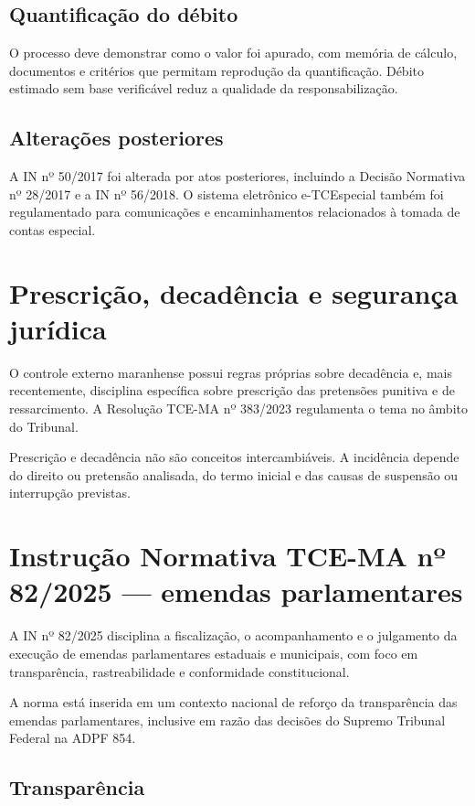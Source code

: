 \subsection{Quantificação do débito}

O processo deve demonstrar como o valor foi apurado, com memória de cálculo, documentos e critérios que permitam reprodução da quantificação. Débito estimado sem base verificável reduz a qualidade da responsabilização.

\subsection{Alterações posteriores}

A IN nº 50/2017 foi alterada por atos posteriores, incluindo a Decisão Normativa nº 28/2017 e a IN nº 56/2018. O sistema eletrônico e-TCEspecial também foi regulamentado para comunicações e encaminhamentos relacionados à tomada de contas especial.

\section{Prescrição, decadência e segurança jurídica}

O controle externo maranhense possui regras próprias sobre decadência e, mais recentemente, disciplina específica sobre prescrição das pretensões punitiva e de ressarcimento. A Resolução TCE-MA nº 383/2023 regulamenta o tema no âmbito do Tribunal.

Prescrição e decadência não são conceitos intercambiáveis. A incidência depende do direito ou pretensão analisada, do termo inicial e das causas de suspensão ou interrupção previstas.

\section{Instrução Normativa TCE-MA nº 82/2025 — emendas parlamentares}

A IN nº 82/2025 disciplina a fiscalização, o acompanhamento e o julgamento da execução de emendas parlamentares estaduais e municipais, com foco em transparência, rastreabilidade e conformidade constitucional.

A norma está inserida em um contexto nacional de reforço da transparência das emendas parlamentares, inclusive em razão das decisões do Supremo Tribunal Federal na ADPF 854.

\subsection{Transparência}

